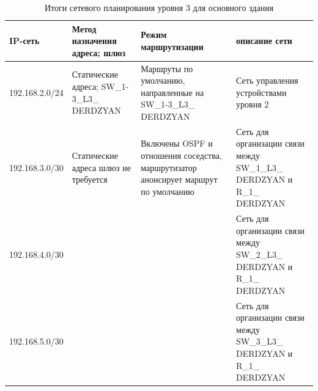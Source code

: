 \begin{table}[H]
\centering
{}
\caption{Итоги сетевого планирования уровня 3 для основного здания\label{table:all_set_plan_oz}}
\small
\begin{tabularx}{\textwidth}{|X|X|X|X|}
    \hline
	IP-сеть				&	Метод назначения адреса; шлюз	&	Режим маршрутизации	& описание сети	\\ 
	\hline
	192.168.2.0/24 		& Статические адреса; SW\_1-3\_L3\_ DERDZYAN & Маршруты по умолчанию, направленные на SW\_1-3\_L3\_ DERDZYAN & Сеть управления устройствами уровня 2\\
	\hline
	192.168.3.0/30		& Статические адреса шлюз не требуется 		& Включены OSPF и отношения соседства, маршрутизатор анонсирует маршрут по умолчанию & Сеть для организации связи между SW\_1\_L3\_ DERDZYAN и R\_1\_ DERDZYAN \\
	\cline{1-1}\cline{4-4}
	192.168.4.0/30		&                                          	&																				 	& Сеть для организации связи между SW\_2\_L3\_ DERDZYAN и R\_1\_ DERDZYAN \\
	\cline{1-1}\cline{4-4}
	192.168.5.0/30		&                                      		&                                                                                    & Сеть для организации связи между SW\_3\_L3\_ DERDZYAN и R\_1\_ DERDZYAN \\
\end{tabularx}
\end{table}

